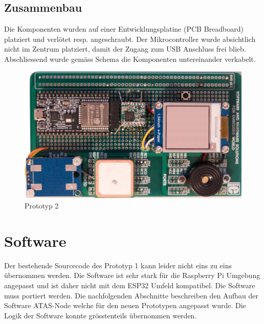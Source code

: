 \documentclass[11pt,english,german]{report}
\theoremstyle{definition}
\begin{document}
\newpage
\subsection{Zusammenbau}
Die Komponenten wurden auf einer Entwicklungsplatine (PCB Breadboard) platziert und verlötet resp. angeschraubt. Der Mikrocontroller wurde absichtlich nicht im Zentrum platziert, damit der Zugang zum USB Anschluss frei blieb. Abschliessend wurde gemäss Schema die Komponenten untereinander verkabelt.\\
\begin{figure}[H]
	\centering
	\includegraphics[width=\textwidth]{img/prototype/prototyp2.jpg}
	\caption[Prototyp 2]
	{Prototyp 2}
\end{figure}

\newpage
\section{Software}
Der bestehende Sourcecode des Prototyp 1 kann leider nicht eins zu eins übernommen werden. Die Software ist sehr stark für die Raspberry Pi Umgebung angepasst und ist daher nicht mit dem ESP32 Umfeld kompatibel. Die Software muss portiert werden. Die nachfolgenden Abschnitte beschreiben den Aufbau der Software ATAS-Node welche für den neuen Prototypen angepasst wurde. Die Logik der Software konnte grösstenteils übernommen werden. 
\end{document}
